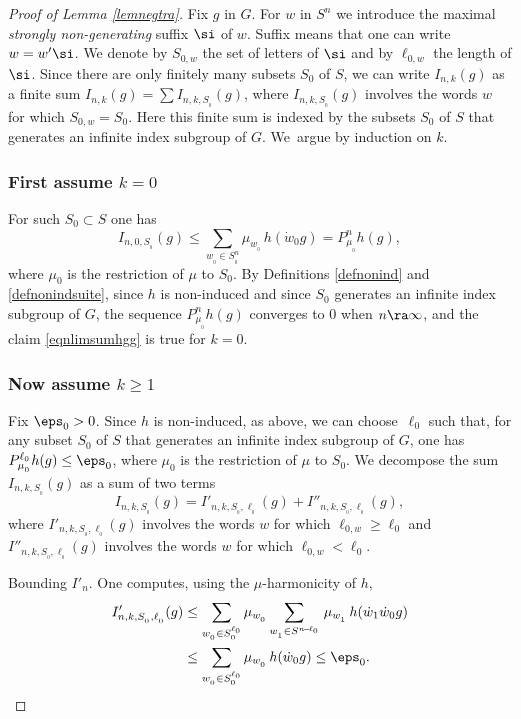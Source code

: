 \begin{proof}[Proof of Lemma \ref{lemnegtra}]
Fix $g$ in $G$. For $w$ in $S^n$ we introduce
the maximal \emph{strongly non-generating} suffix $\si$ of $w$.
Suffix means that one can write $w=w'\si$.
We denote by $S_{0,w}$ the set of letters of $\si$ and
by $\ell_{0,w}$ the length of $\si$.
Since there are only finitely many subsets $S_0$ of $S$,
we can write $I_{n,k}(g)$
as a finite sum $I_{n,k}(g)=\sum I_{n,k,S_{_0}}(g)$,
where $I_{n,k,S_{_0}}(g)$ involves the words $w$ for which $S_{0,w}=S_0$.
Here this finite sum is indexed by the subsets $S_0$ of $S$ that generates an infinite index subgroup of $G$.
We~argue by induction on $k$.

\subsubsection*{First assume $k=0$}
For such $S_0\subset S$
one has
\[
I_{n,0,S_{_0}}(g)\leq
\sum_{w_{_0}\in S_{_0}^{n}}\mu_{w_{_0}}\, h(\dot{w}_0g)
=
P_{\mu_{_0}}^nh(g),
\]
where $\mu_0$ is the
restriction of $\mu$ to $S_0$.
By Definitions \ref{defnonind} and \ref{defnonindsuite}, since $h$ is non-induced
and since $S_0$ generates an infinite index subgroup of $G$, the sequence
$P_{\mu_{_0}}^nh(g)$ converges to $0$ when $n\ra \infty$,
and the claim \eqref{eqnlimsumhgg} is true for $k=0$.

\subsubsection*{Now assume $k\geq 1$}
Fix $\eps_0>0$.
Since $h$ is non-induced, as above, we can choose~$\ell_0$ such that,
for any subset $S_0$ of $S$ that generates an infinite index subgroup of $G$,
one has $P_{\mu_{_0}}^{\ell_0}h(g)\leq \eps_0$, where $\mu_0$ is the
restriction of $\mu$ to $S_0$.
We decompose the sum $I_{n,k,S_{_0}}(g)$ as a sum of two terms
\[
I_{n,k,S_{_0}}(g)=
I'_{n,k,S_{_0},\ell_{_0}}(g)+I''_{n,k,S_{_0},\ell_{_0}}(g),
\]
where
$I'_{n,k,S_{_0},\ell_{_0}}(g)$ involves the words $w$ for which $\ell_{0,w}\geq \ell_0$ and
$I''_{n,k,S_{_0},\ell_{_0}}(g)$
involves the words $w$ for which $\ell_{0,w}< \ell_0$.

Bounding $I'_n$. One computes, using the $\mu$-harmonicity of $h$,
\begin{align*}
I'_{n,k,S_{_0},\ell_{_0}}(g)&\leq
\sum_{w_{_0}\in S_{_0}^{\ell_0}}\mu_{w_{_0}}
\sum_{w_{_1}\in S^{n\!-\!\ell_0}}\,
\mu_{w_{_1}}\, h(\dot{w}_{1}\dot{w}_0g)\\
&\leq
\sum_{w_{_0}\in S_{_0}^{\ell_0}}\mu_{w_{_0}}\, h(\dot{w}_0g)\leq \eps_0.
\end{align*}


\end{proof}
